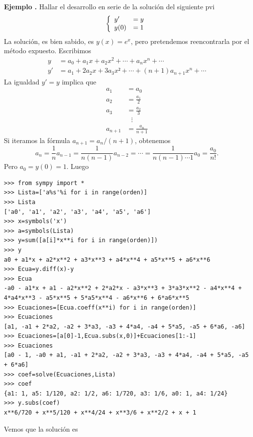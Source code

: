 \documentclass{article}
\newcounter{ejem_cont}
\newenvironment{ejemplo}[1]{\refstepcounter{ejem_cont}\vspace{1ex}\noindent\textbf{Ejemplo \arabic{ejem_cont}.} #1}{}
\begin{document}
\begin{ejemplo} Hallar el desarrollo en serie de la solución del siguiente pvi 
\[\left\{\begin{array}{l l} y'&=y\\ y(0)&=1\end{array}\right.\]
La solución, es bien sabido, es $y(x)=e^x$,  pero pretendemos reencontrarla por el método expuesto. Escribimos
\[\begin{split}
   y&=a_0+a_1x+a_2x^2+\cdots+a_nx^n+\cdots\\
   y'&=a_1+2a_2x+3a_3x²+\cdots+(n+1)a_{n+1}x^n+\cdots
  \end{split}
\]
La igualdad $y'=y$ implica que 
\[\begin{split}
   a_1&=a_0\\
   a_2&=\frac{a_1}{2}\\
   a_3&=\frac{a_2}{3}\\
      &\,\,\,\,\vdots \\
   a_{n+1}&=\frac{a_{n}}{n+1}
 \end{split}
\]
Si iteramos la fórmula $a_{n+1}=a_{n}/(n+1)$, obtenemos 
\[a_n=\frac{1}{n}a_{n-1}=\frac{1}{n(n-1)}a_{n-2}=\cdots=\frac{1}{n(n-1)\cdots 1}a_{0}=\frac{a_0}{n!}.\]
Pero $a_0=y(0)=1$. Luego 




\begin{lstlisting}
>>> from sympy import *
>>> Lista=['a%s'%i for i in range(orden)]
>>> Lista
['a0', 'a1', 'a2', 'a3', 'a4', 'a5', 'a6']
>>> x=symbols('x')
>>> a=symbols(Lista)
>>> y=sum([a[i]*x**i for i in range(orden)])
>>> y
a0 + a1*x + a2*x**2 + a3*x**3 + a4*x**4 + a5*x**5 + a6*x**6
>>> Ecua=y.diff(x)-y
>>> Ecua
-a0 - a1*x + a1 - a2*x**2 + 2*a2*x - a3*x**3 + 3*a3*x**2 - a4*x**4 + 4*a4*x**3 - a5*x**5 + 5*a5*x**4 - a6*x**6 + 6*a6*x**5
>>> Ecuaciones=[Ecua.coeff(x**i) for i in range(orden)]
>>> Ecuaciones
[a1, -a1 + 2*a2, -a2 + 3*a3, -a3 + 4*a4, -a4 + 5*a5, -a5 + 6*a6, -a6]
>>> Ecuaciones=[a[0]-1,Ecua.subs(x,0)]+Ecuaciones[1:-1]
>>> Ecuaciones
[a0 - 1, -a0 + a1, -a1 + 2*a2, -a2 + 3*a3, -a3 + 4*a4, -a4 + 5*a5, -a5 + 6*a6]
>>> coef=solve(Ecuaciones,Lista)
>>> coef
{a1: 1, a5: 1/120, a2: 1/2, a6: 1/720, a3: 1/6, a0: 1, a4: 1/24}
>>> y.subs(coef)
x**6/720 + x**5/120 + x**4/24 + x**3/6 + x**2/2 + x + 1
\end{lstlisting}


Vemos que la solución es 
\end{ejemplo}
\end{document}
